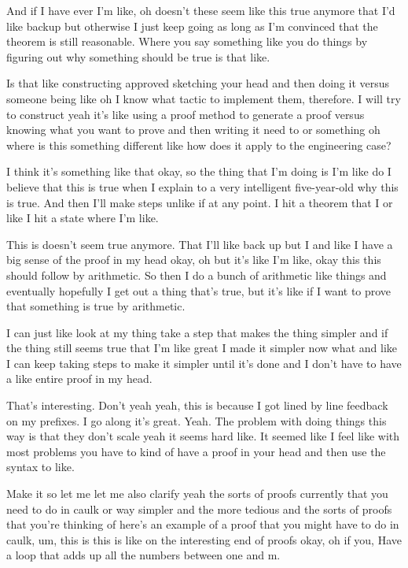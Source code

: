 And if I have ever I'm like, oh doesn't these seem like this true anymore that I'd like backup but otherwise I just keep going as long as I'm convinced that the theorem is still reasonable. Where you say something like you do things by figuring out why something should be true is that like. 

Is that like constructing approved sketching your head and then doing it versus someone being like oh I know what tactic to implement them, therefore. I will try to construct yeah it's like using a proof method to generate a proof versus knowing what you want to prove and then writing it need to or something oh where is this something different like how does it apply to the engineering case? 

I think it's something like that okay, so the thing that I'm doing is I'm like do I believe that this is true when I explain to a very intelligent five-year-old why this is true. And then I'll make steps unlike if at any point. I hit a theorem that I or like I hit a state where I'm like. 

This is doesn't seem true anymore. That I'll like back up but I and like I have a big sense of the proof in my head okay, oh but it's like I'm like, okay this this should follow by arithmetic. So then I do a bunch of arithmetic like things and eventually hopefully I get out a thing that's true, but it's like if I want to prove that something is true by arithmetic. 

I can just like look at my thing take a step that makes the thing simpler and if the thing still seems true that I'm like great I made it simpler now what and like I can keep taking steps to make it simpler until it's done and I don't have to have a like entire proof in my head. 

That's interesting. Don't yeah yeah, this is because I got lined by line feedback on my prefixes. I go along it's great. Yeah. The problem with doing things this way is that they don't scale yeah it seems hard like. It seemed like I feel like with most problems you have to kind of have a proof in your head and then use the syntax to like. 

Make it so let me let me also clarify yeah the sorts of proofs currently that you need to do in caulk or way simpler and the more tedious and the sorts of proofs that you're thinking of here's an example of a proof that you might have to do in caulk, um, this is this is like on the interesting end of proofs okay, oh if you, Have a loop that adds up all the numbers between one and m. 

